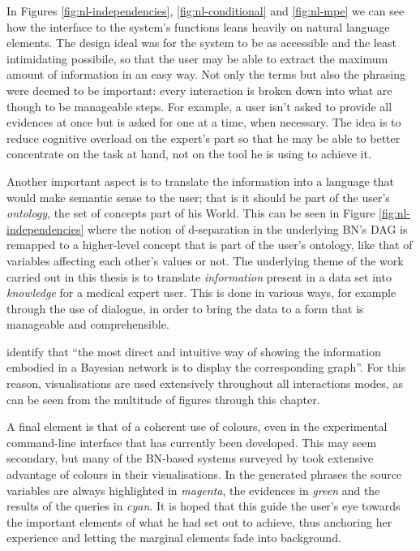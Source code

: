 In Figures \ref{fig:nl-independencies}, \ref{fig:nl-conditional} and \ref{fig:nl-mpe} we can see how the interface to the system's functions leans heavily on natural language elements.
The design ideal was for the system to be as accessible and the least intimidating possibile, so that the user may be able to extract the maximum amount of information in an easy way.
Not only the terms but also the phrasing were deemed to be important: every interaction is broken down into what are though to be manageable steps.
For example, a user isn't asked to provide all evidences at once but is asked for one at a time, when necessary.
The idea is to reduce cognitive overload on the expert's part so that he may be able to better concentrate on the task at hand, not on the tool he is using to achieve it.

Another important aspect is to translate the information into a language that would make semantic sense to the user; that is it should be part of the user's \textit{ontology}, the set of concepts part of his World.
This can be seen in Figure \ref{fig:nl-independencies} where the notion of d-separation in the underlying BN's DAG is remapped to a higher-level concept that is part of the user's ontology, like that of variables affecting each other's values or not.
The underlying theme of the work carried out in this thesis is to translate \textit{information} present in a data set into \textit{knowledge} for a medical expert user.
This is done in various ways, for example through the use of dialogue, in order to bring the data to a form that is manageable and comprehensible.

\citet{lacave2002review} identify that \enquote{the most direct and intuitive way of showing the information embodied in a Bayesian network is to display the corresponding graph}.
For this reason, visualisations are used extensively throughout all interactions modes, as can be seen from the multitude of figures through this chapter. 

A final element is that of a coherent use of colours, even in the experimental command-line interface that has currently been developed.
This may seem secondary, but many of the BN-based systems surveyed by \citet{lacave2002review} took extensive advantage of colours in their visualisations.
In the generated phrases the source variables are always highlighted in \textit{magenta}, the evidences in \textit{green} and the results of the queries in \textit{cyan}.
It is hoped that this guide the user's eye towards the important elements of what he had set out to achieve, thus anchoring her experience and letting the marginal elements fade into background.

